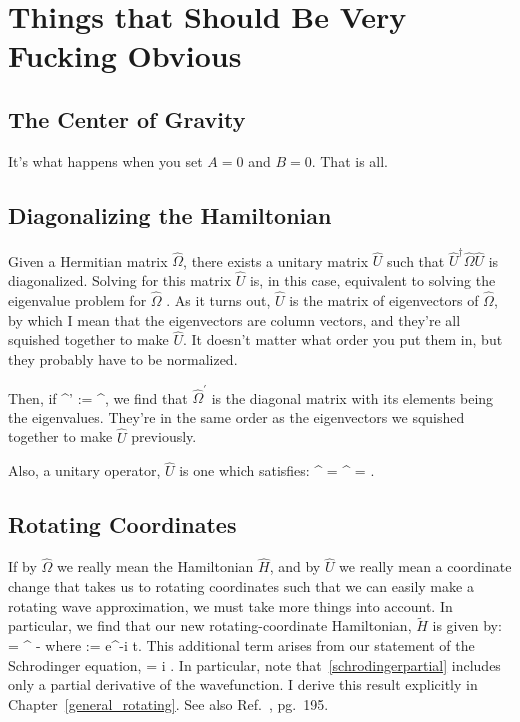 \chapter[Fucking Duh]{Things that Should Be Very Fucking \mbox{Obvious}}
\label{fuckingduh}

\section{The Center of Gravity}
It's what happens when you set $A = 0$ and $B = 0$.   That is all.

\section{Diagonalizing the Hamiltonian}
Given a Hermitian matrix $\hat{\Omega}$, there exists a unitary matrix $\hat{U}$ such that $\hat{U}^{\dagger}\hat{\Omega}\hat{U}$ is diagonalized.  Solving for this matrix $\hat{U}$ is, in this case, equivalent to solving the eigenvalue problem for $\hat{\Omega}$ \cite{shankar}.  As it turns out, $\hat{U}$ is the matrix of eigenvectors of $\hat{\Omega}$, by which I mean that the eigenvectors are column vectors, and they're all squished together to make $\hat{U}$.  It doesn't matter what order you put them in, but they probably have to be normalized.

Then, if 
\beq
\hat{\Omega}^{'} := ^{\dagger}\hat{\Omega},
\eeq	
we find that $\hat{\Omega}^{'}$ is the diagonal matrix with its elements being the eigenvalues.  They're in the same order as the eigenvectors we squished together to make $\hat{U}$ previously.

Also, a unitary operator, $\hat{U}$ is one which satisfies:
\bea
{}^{\dagger} = ^{\dagger}  = .
\eea

\section{Rotating Coordinates}
\label{rotating}
If by $\hat{\Omega}$ we really mean the Hamiltonian $\hat{H}$, and by $\hat{U}$ we really mean a coordinate change that takes us to rotating coordinates such that we can easily make a rotating wave approximation, we must take more things into account.  In particular, we find that our new rotating-coordinate Hamiltonian, $\tilde{H}$ is given by:
\beq
{} = ^{\dagger}   - \hbar {}
\eeq
where
\beq
{} := e^{-i  t}.  
\eeq
This additional term arises from our statement of the Schrodinger equation, 
\beq
\label{schrodingerpartial}
 \ket{\psi} = i \hbar {} \ket{\psi}.
\eeq
In particular, note that~\ref{schrodingerpartial} includes only a partial derivative of the wavefunction.  I derive this result explicitly in Chapter~\ref{general_rotating}.  See also Ref.~\cite{budker_opticallypolarized}, pg.~195.

